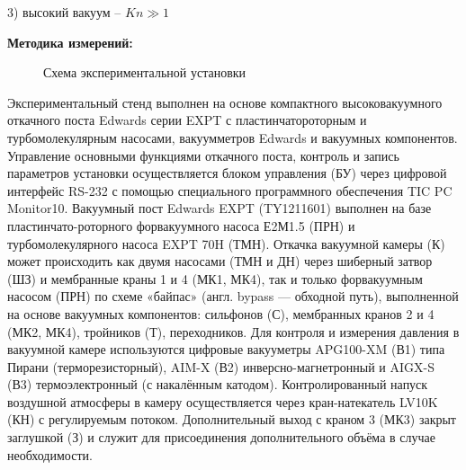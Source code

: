 \documentclass[a4paper, 12pt]{article}%
\begin{document}
	3) высокий вакуум -- $Kn \gg 1$
	
	\textbf{Методика измерений: }\\
	
	\begin{figure}[h]
		\caption {Схема экспериментальной установки}
	\end{figure}
	
	Экспериментальный стенд выполнен на основе компактного высоковакуумного откачного поста Edwards серии EXPT с пластинчатороторным и турбомолекулярным насосами, вакуумметров Edwards
	и вакуумных компонентов. Управление основными функциями откачного поста, контроль и запись параметров установки осуществляется блоком управления (БУ) через цифровой интерфейс RS-232
	с помощью специального программного обеспечения TIC PC Monitor10.
	Вакуумный пост Edwards EXPT (TY1211601) выполнен на базе
	пластинчато-роторного форвакуумного насоса Е2М1.5 (ПРН) и турбомолекулярного насоса EXPT 70H (ТМН). Откачка вакуумной камеры (К) может происходить как двумя насосами (ТМН и ДН) через шиберный затвор (ШЗ) и мембранные краны 1 и 4 (МК1, МК4), так и только форвакуумным насосом (ПРН) по схеме «байпас» (англ. bypass — обходной путь),
	выполненной на основе вакуумных компонентов: сильфонов (С), мембранных кранов 2 и 4 (МК2, МК4), тройников (Т), переходников.
	Для контроля и измерения давления в вакуумной камере используются цифровые вакууметры APG100-XM (В1) типа Пирани (терморезисторный), AIM-X (В2) инверсно-магнетронный и AIGX-S (В3) термоэлектронный (с накалённым катодом).
	Контролированный напуск воздушной атмосферы в камеру осуществляется через кран-натекатель LV10K (КН) с регулируемым потоком.
	Дополнительный выход с краном 3 (МК3) закрыт заглушкой (З) и служит
	для присоединения дополнительного объёма в случае необходимости.\\
	
\end{document}
